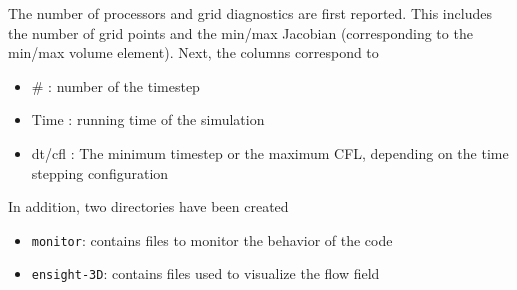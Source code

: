 \documentclass[12pt]{article}
\newcommand{\code}[1]{\texttt{#1}}
\begin{document}
\noindent The number of processors and grid diagnostics are first reported. This includes the number of grid points and the min/max Jacobian (corresponding to the min/max volume element). Next, the columns correspond to
\begin{itemize}
\item \# : number of the timestep
\item Time : running time of the simulation
\item dt/cfl : The minimum timestep or the maximum CFL, depending on the time stepping configuration
\end{itemize}
In addition, two directories have been created
\begin{itemize}
\item \code{monitor}: contains files to monitor the behavior of the code
\item \code{ensight-3D}: contains files used to visualize the flow field
\end{itemize}

\end{document}
